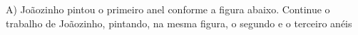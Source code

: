 \documentclass[preview]{standalone}
\begin{document}
\begin{center}
A) Joãozinho pintou o primeiro 
anel conforme a figura abaixo.
Continue o trabalho de Joãozinho, pintando,
na mesma figura, o segundo e o terceiro anéis
\end{center}
\end{document}
